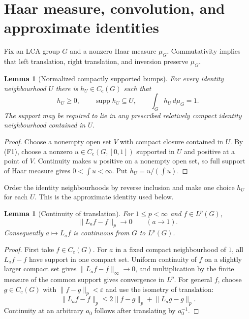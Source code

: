 \documentclass[11pt]{article}
\newtheorem{lemma}[theorem]{Lemma}
\theoremstyle{definition}
\theoremstyle{remark}
\newcommand{\supp}{\operatorname{supp}}
\newcommand{\Cc}{C_{\mathrm c}}
\newcommand{\Lp}[1]{L^{#1}}
\newcommand{\norm}[1]{\lVert #1\rVert}
\begin{document}
\section{Haar measure, convolution, and approximate identities}
\label{sec:haar-convolution}

Fix an LCA group $G$ and a nonzero Haar measure $\mu_G$.  Commutativity implies that
left translation, right translation, and inversion preserve $\mu_G$.

\begin{lemma}[Normalized compactly supported bumps]
\label{lem:normalized-bump}
For every identity neighbourhood $U$ there is $h_U\in\Cc(G)$ such that
\[
  h_U\geq0,\qquad \supp h_U\subseteq U,\qquad
  \int_Gh_U\,d\mu_G=1.
\]
The support may be required to lie in any prescribed relatively compact identity
neighbourhood contained in $U$.
\end{lemma}

\begin{proof}
Choose a nonempty open set $V$ with compact closure contained in $U$.  By (F1), choose
a nonzero $u\in\Cc(G,[0,1])$ supported in $U$ and positive at a point of $V$.
Continuity makes $u$ positive on a nonempty open set, so full support of Haar measure
gives $0<\int u<\infty$.  Put $h_U=u/(\int u)$.
\end{proof}

Order the identity neighbourhoods by reverse inclusion and make one choice $h_U$ for
each $U$.  This is the approximate identity used below.

\begin{lemma}[Continuity of translation]
\label{lem:translation-continuity}
For $1\leq p<\infty$ and $f\in\Lp p(G)$,
\[
  \norm{L_af-f}_p\longrightarrow0\qquad(a\to1).
\]
Consequently $a\mapsto L_af$ is continuous from $G$ to $\Lp p(G)$.
\end{lemma}

\begin{proof}
First take $f\in\Cc(G)$.  For $a$ in a fixed compact neighbourhood of $1$, all
$L_af-f$ have support in one compact set.  Uniform continuity of $f$ on a slightly
larger compact set gives $\norm{L_af-f}_\infty\to0$, and multiplication by the finite
measure of the common support gives convergence in $\Lp p$.  For general $f$, choose
$g\in\Cc(G)$ with $\norm{f-g}_p<\varepsilon$ and use the isometry of translation:
\[
 \norm{L_af-f}_p
 \leq 2\norm{f-g}_p+\norm{L_ag-g}_p.
\]
Continuity at an arbitrary $a_0$ follows after translating by $a_0^{-1}$.
\end{proof}
\end{document}
